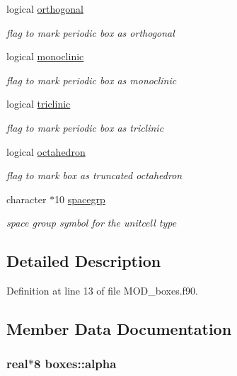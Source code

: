 \begin{DoxyCompactItemize}
logical \hyperlink{classboxes_a504790714b65897e53bbf86bdffd8ef2}{orthogonal}
\begin{DoxyCompactList}\small\item\em flag to mark periodic box as orthogonal \end{DoxyCompactList}\item 
logical \hyperlink{classboxes_a5b089e02ceadb0f2e89c8deec0d87491}{monoclinic}
\begin{DoxyCompactList}\small\item\em flag to mark periodic box as monoclinic \end{DoxyCompactList}\item 
logical \hyperlink{classboxes_ab96dd924f424ba92884f3a7adf3623a6}{triclinic}
\begin{DoxyCompactList}\small\item\em flag to mark periodic box as triclinic \end{DoxyCompactList}\item 
logical \hyperlink{classboxes_ae928df89d1aa69fc06a8e8ba5db3b9a6}{octahedron}
\begin{DoxyCompactList}\small\item\em flag to mark box as truncated octahedron \end{DoxyCompactList}\item 
character $\ast$10 \hyperlink{classboxes_a156da4dc49d38d44e617030b4118e37d}{spacegrp}
\begin{DoxyCompactList}\small\item\em space group symbol for the unitcell type \end{DoxyCompactList}\end{DoxyCompactItemize}


\subsection{Detailed Description}


Definition at line 13 of file M\-O\-D\-\_\-boxes.\-f90.



\subsection{Member Data Documentation}
\hypertarget{classboxes_a6c476981aef5058cb9f12ce309ca043b}{
\subsubsection[{alpha}]{\setlength{\rightskip}{0pt plus 5cm}real$\ast$8 boxes\-::alpha}}\label{classboxes_a6c476981aef5058cb9f12ce309ca043b}


